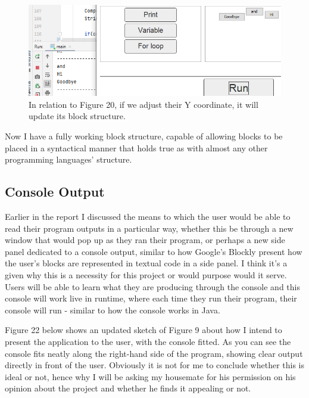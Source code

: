 \documentclass[a4paper, 12pt]{article}
\begin{document}
            \begin{figure}[h]
                \centering
                \includegraphics[width=120mm]{blockstructure4.png}
                \caption{In relation to Figure 20, if we adjust their Y coordinate, it will update
                its block structure.}
            \end{figure}
            
            Now I have a fully working block structure, capable of allowing blocks to be placed in a
            syntactical manner that holds true as with almost any other programming languages' structure.

        \clearpage
        \subsection{Console Output}
            Earlier in the report I discussed the means to which the user would be able to 
            read their program outputs in a particular way, whether this be through a new window
            that would pop up as they ran their program, or perhaps a new side panel dedicated to
            a console output, similar to how Google's Blockly present how the user's blocks are
            represented in textual code in a side panel. I think it's a given why this is a necessity
            for this project or would purpose would it serve. Users will be able to learn what they
            are producing through the console and this console will work live in runtime, where each
            time they run their program, their console will run - similar to how the console works
            in Java.

            Figure 22 below shows an updated sketch of Figure 9 about how I intend to present the
            application to the user, with the console fitted. As you can see the console fits neatly
            along the right-hand side of the program, showing clear output directly in front of
            the user. Obviously it is not for me to conclude whether this is ideal or not, hence why
            I will be asking my housemate for his permission on his opinion about the project and
            whether he finds it appealing or not.
\end{document}
